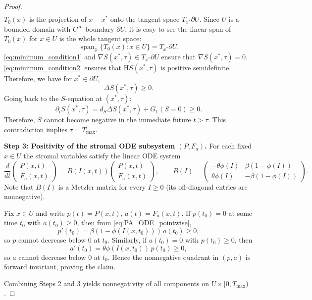 \documentclass[10pt,a4paper]{amsart}
\begin{document}
\begin{proof}
\begin{align*}
\end{align*}
$T_0(x)$ is the projection of $x-x^*$ onto the tangent space $T_{x^*}\partial U$. Since $U$ is a bounded domain with $C^\infty$ boundary $\partial U$, it is easy to see the linear span of $T_0(x)$ for $x\in U$ is the whole tangent space:
\begin{equation*}
    \operatorname{span}_{\mathbb{R}} \{T_0(x): x\in U\} = T_{x^*}\partial U.
\end{equation*}
\eqref{eq:minimum_condition1} and $\nabla S(x^*,\tau)\in T_{x^*}\partial U$ ensure that $\nabla S(x^*,\tau) = 0$. \eqref{eq:minimum_condition2} ensures that $\mathrm{H}S(x^*,\tau)$ is positive semidefinite. Therefore, we have for $x^*\in \partial U$,
\[
\Delta S(x^*,\tau) \ge 0.
\]
Going back to the $S$-equation at $(x^*,\tau)$:
\[
\partial_t S(x^*,\tau) = d_S\Delta S(x^*,\tau) + G_1(S = 0) \ge 0.
\]
Therefore, $S$ cannot become negative in the immediate future $t>\tau$. This contradiction implies $\tau=T_{\max}$.

\smallskip
\noindent\textbf{Step 3: Positivity of the stromal ODE subsystem $(P,F_a)$.}
For each fixed $x\in U$ the stromal variables satisfy the linear ODE system
\begin{equation}\label{eq:PA_ODE_pointwise}
\frac{d}{dt}
\begin{pmatrix}
P(x,t)\\ F_a(x,t)
\end{pmatrix}
=
B(I(x,t))
\begin{pmatrix}
P(x,t)\\ F_a(x,t)
\end{pmatrix},
\qquad
B(I)=
\begin{pmatrix}
-\theta\phi(I) & \beta(1-\phi(I))\\
\theta\phi(I) & -\beta(1-\phi(I))
\end{pmatrix}.
\end{equation}
Note that $B(I)$ is a Metzler matrix for every $I\ge0$ (its off-diagonal entries are nonnegative).

Fix $x\in U$ and write $p(t)=P(x,t)$, $a(t)=F_a(x,t)$.
If $p(t_0)=0$ at some time $t_0$ with $a(t_0)\ge0$, then from \eqref{eq:PA_ODE_pointwise},
\[
p'(t_0)=\beta(1-\phi(I(x,t_0)))\,a(t_0)\ge 0,
\]
so $p$ cannot decrease below $0$ at $t_0$.
Similarly, if $a(t_0)=0$ with $p(t_0)\ge0$, then
\[
a'(t_0)=\theta\phi(I(x,t_0))\,p(t_0)\ge 0,
\]
so $a$ cannot decrease below $0$ at $t_0$.
Hence the nonnegative quadrant in $(p,a)$ is forward invariant, proving the claim.

Combining Steps 2 and 3 yields nonnegativity of all components on $\overline U\times[0,T_{\max})$.
\end{proof}
\end{document}
